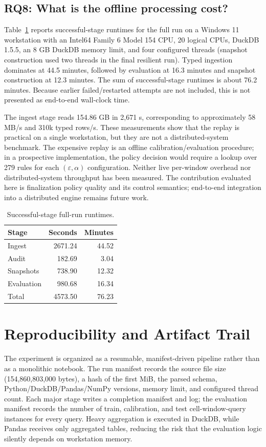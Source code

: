 \documentclass[conference]{IEEEtran}
\newcommand{\eps}{\varepsilon}
\begin{document}
\subsection{RQ8: What is the offline processing cost?}
Table~\ref{tab:runtime} reports successful-stage runtimes for the full run on a Windows 11 workstation with an Intel64 Family 6 Model 154 CPU, 20 logical CPUs, DuckDB 1.5.5, an 8 GB DuckDB memory limit, and four configured threads (snapshot construction used two threads in the final resilient run). Typed ingestion dominates at 44.5 minutes, followed by evaluation at 16.3 minutes and snapshot construction at 12.3 minutes. The sum of successful-stage runtimes is about 76.2 minutes. Because earlier failed/restarted attempts are not included, this is not presented as end-to-end wall-clock time.

The ingest stage reads 154.86 GB in 2,671 s, corresponding to approximately 58 MB/s and 310k typed rows/s. These measurements show that the replay is practical on a single workstation, but they are not a distributed-system benchmark. The expensive replay is an offline calibration/evaluation procedure; in a prospective implementation, the policy decision would require a lookup over 279 rules for each $(\eps,\alpha)$ configuration. Neither live per-window overhead nor distributed-system throughput has been measured. The contribution evaluated here is finalization policy quality and its control semantics; end-to-end integration into a distributed engine remains future work.

\begin{table}[t]
\caption{Successful-stage full-run runtimes.}
\label{tab:runtime}
\centering
\begin{tabular}{lrr}
\toprule
Stage & Seconds & Minutes \\
\midrule
Ingest & 2671.24 & 44.52 \\
Audit & 182.69 & 3.04 \\
Snapshots & 738.90 & 12.32 \\
Evaluation & 980.68 & 16.34 \\
\midrule
Total & 4573.50 & 76.23 \\
\bottomrule
\end{tabular}
\end{table}

\section{Reproducibility and Artifact Trail}
The experiment is organized as a resumable, manifest-driven pipeline rather than as a monolithic notebook. The run manifest records the source file size (154,860,803,000 bytes), a hash of the first MiB, the parsed schema, Python/DuckDB/Pandas/NumPy versions, memory limit, and configured thread count. Each major stage writes a completion manifest and log; the evaluation manifest records the number of train, calibration, and test cell-window-query instances for every query. Heavy aggregation is executed in DuckDB, while Pandas receives only aggregated tables, reducing the risk that the evaluation logic silently depends on workstation memory.
\end{document}
